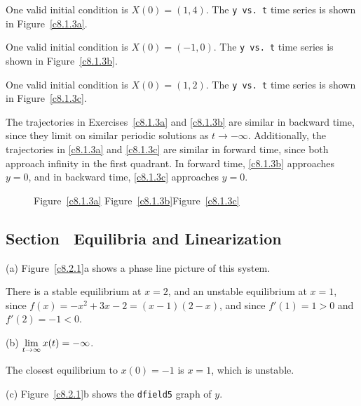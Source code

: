 One valid initial condition is $X(0) = (1,4)$.  The {\tt y vs.\ t}
time series is shown in Figure~\ref{c8.1.3a}.

One valid initial condition is $X(0) = (-1,0)$.  The {\tt y vs.\ t}
time series is shown in Figure~\ref{c8.1.3b}.

\newpage
{} One valid initial condition is $X(0) = (1,2)$.  The
{\tt y vs.\ t} time series is shown in Figure~\ref{c8.1.3c}.

\para The trajectories in Exercises~\ref{c8.1.3a} and \ref{c8.1.3b} are
similar in backward time, since they limit on similar periodic
solutions as $t \rightarrow -\infty$.  Additionally, the trajectories
in \ref{c8.1.3a} and \ref{c8.1.3c} are similar in forward time, since
both approach infinity in the first quadrant.  In forward time,
\ref{c8.1.3b} approaches $y = 0$, and in backward time, \ref{c8.1.3c}
approaches $y = 0$.

\begin{figure}[htb]
                       \centerline{%
                       }
		\centerline{Figure~\ref{c8.1.3a}\hspace{1.2in}
Figure~\ref{c8.1.3b}\hspace{1.2in}Figure~\ref{c8.1.3c}}
\end{figure}



\subsection*{Section~\protect{\ref{S:linearization}} Equilibria and Linearization}

(a) \ans Figure~\ref{c8.2.1}a shows a phase line picture
of this system.

\soln There is a stable equilibrium at $x = 2$, and an unstable
equilibrium at $x = 1$, since $f(x) = -x^2 + 3x - 2 = (x - 1)(2 - x)$,
and since $f'(1) = 1 > 0$ and $f'(2) = -1 < 0$.

(b) \ans $\displaystyle\lim_{t \to \infty} x(t) = -\infty$.

\soln The closest equilibrium to $x(0) = -1$ is $x = 1$, which is
unstable. 

(c) \ans Figure~\ref{c8.2.1}b shows the {\tt dfield5} graph of $y$.

